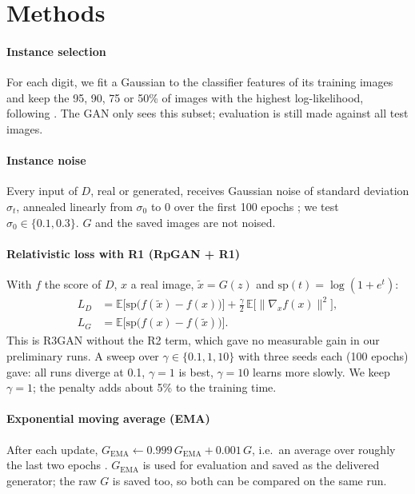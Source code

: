 \section{Methods}
\label{sec:method}
\paragraph{Instance selection}
For each digit, we fit a Gaussian to the classifier features of its training images and keep the 95, 90, 75 or 50\% of images with the highest log-likelihood, following \cite{devries2020}. The GAN only sees this subset; evaluation is still made against all test images.

\paragraph{Instance noise}
Every input of $D$, real or generated, receives Gaussian noise of standard deviation $\sigma_t$, annealed linearly from $\sigma_0$ to 0 over the first 100 epochs \cite{sonderby2017}; we test $\sigma_0\in\{0.1,0.3\}$. $G$ and the saved images are not noised.

\paragraph{Relativistic loss with R1 (RpGAN + R1)}
With $f$ the score of $D$, $x$ a real image, $\tilde x=G(z)$ and $\mathrm{sp}(t)=\log(1+e^t)$:
\begin{align*}
L_D &= \mathbb{E}\big[\mathrm{sp}\big(f(\tilde x)-f(x)\big)\big] + \tfrac{\gamma}{2}\,\mathbb{E}\big[\|\nabla_x f(x)\|^2\big],\\
L_G &= \mathbb{E}\big[\mathrm{sp}\big(f(x)-f(\tilde x)\big)\big].
\end{align*}
This is R3GAN \cite{huang2024} without the R2 term, which gave no measurable gain in our preliminary runs. A sweep over $\gamma\in\{0.1,1,10\}$ with three seeds each (100 epochs) gave: all runs diverge at 0.1, $\gamma=1$ is best, $\gamma=10$ learns more slowly. We keep $\gamma=1$; the penalty adds about 5\% to the training time.

\paragraph{Exponential moving average (EMA)}
After each update, $G_\mathrm{EMA}\leftarrow 0.999\,G_\mathrm{EMA}+0.001\,G$, i.e.\ an average over roughly the last two epochs \cite{yazici2019}. $G_\mathrm{EMA}$ is used for evaluation and saved as the delivered generator; the raw $G$ is saved too, so both can be compared on the same run.

